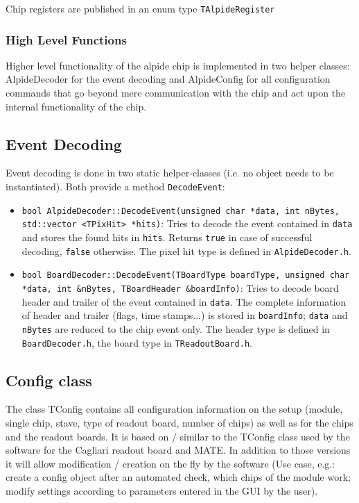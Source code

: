 \documentclass{article}
\begin{document}
Chip registers are published in an enum type \texttt{TAlpideRegister}

\subsubsection{High Level Functions}

Higher level functionality of the alpide chip is implemented in two
helper classes: AlpideDecoder for the event decoding and
AlpideConfig for all configuration commands that go beyond mere
communication with the chip and act upon the internal functionality of
the chip.


\subsection{Event Decoding}

Event decoding is done in two static helper-classes (i.e. no object needs to be instantiated). Both provide a method \texttt{DecodeEvent}:

\begin{itemize}
\item \texttt{bool AlpideDecoder::DecodeEvent(unsigned char *data, int
    nBytes, std::vector <TPixHit> *hits)}: Tries to decode the event
  contained in \texttt{data} and stores the found hits in
  \texttt{hits}. Returns \texttt{true} in case of successful decoding,
  \texttt{false} otherwise. The pixel hit type is defined in
  \texttt{AlpideDecoder.h}.
\item \texttt{bool BoardDecoder::DecodeEvent(TBoardType boardType, unsigned
    char *data, int \&nBytes, TBoardHeader \&boardInfo)}: Tries to
  decode board header and trailer of the event contained in
  \texttt{data}. The complete information of header and trailer
  (flags, time stamps...) is stored in \texttt{boardInfo}; \texttt{data}
  and \texttt{nBytes} are reduced to the chip event only. The header
  type is defined in \texttt{BoardDecoder.h}, the board type in
  \texttt{TReadoutBoard.h}. 
\end{itemize}



\subsection{Config class}

The class TConfig contains all configuration information on the setup
(module, single chip, stave, type of readout board, number of chips)
as well as for the chips and the readout boards. It is based on /
similar to the TConfig class used by the software for the Cagliari
readout board and MATE. In addition to those versions it will allow
modification / creation on the fly by the software (Use case, e.g.:
create a config object after an automated check, which chips of the
module work; modify settings according to parameters entered in the
GUI by the user). 
\end{document}
